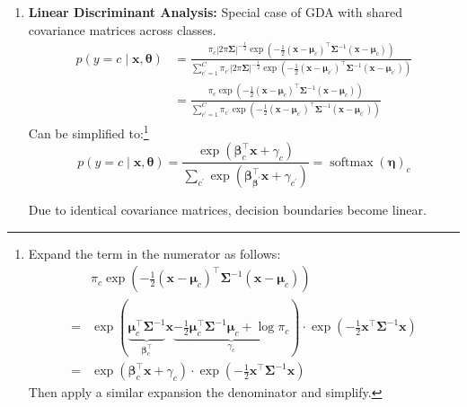 \documentclass[11pt, %
	oneside, %
	english, %
	onehalfspacing, %
	parskip, %
	]{article} %
\theoremstyle{definition}
\begin{document}
\begin{enumerate}
	\item \textbf{Linear Discriminant Analysis:} Special case of GDA with shared covariance matrices across classes.
	\begin{equation*}
		\begin{aligned}
			p(y=c \mid \mathbf{x}, \boldsymbol{\theta}) & =\frac{\pi_c|2 \pi \boldsymbol{\Sigma}|^{-\frac{1}{2}} \exp \left(-\frac{1}{2}\left(\mathbf{x}-\boldsymbol{\mu}_c\right)^{\top} \boldsymbol{\Sigma}^{-1}\left(\mathbf{x}-\boldsymbol{\mu}_c\right)\right)}{\sum_{c^{\prime}=1}^C \pi_{c^{\prime}}|2 \pi \boldsymbol{\Sigma}|^{-\frac{1}{2}} \exp \left(-\frac{1}{2}\left(\mathbf{x}-\boldsymbol{\mu}_{c^{\prime}}\right)^{\top} \boldsymbol{\Sigma}^{-1}\left(\mathbf{x}-\boldsymbol{\mu}_{c^{\prime}}\right)\right)} \\
			& =\frac{\pi_c \exp \left(-\frac{1}{2}\left(\mathbf{x}-\boldsymbol{\mu}_c\right)^{\top} \boldsymbol{\Sigma}^{-1}\left(\mathbf{x}-\boldsymbol{\mu}_c\right)\right)}{\sum_{c^{\prime}=1}^C \pi_{c^{\prime}} \exp \left(-\frac{1}{2}\left(\mathbf{x}-\boldsymbol{\mu}_{c^{\prime}}\right)^{\top} \boldsymbol{\Sigma}^{-1}\left(\mathbf{x}-\boldsymbol{\mu}_{c^{\prime}}\right)\right)}
			\end{aligned}
	\end{equation*}
	Can be simplified to:\footnote{Expand the term in the numerator as follows:
	\begin{equation*}
		\begin{aligned}
			& \pi_c \exp \left(-\frac{1}{2}\left(\mathbf{x}-\boldsymbol{\mu}_c\right)^{\top} \boldsymbol{\Sigma}^{-1}\left(\mathbf{x}-\boldsymbol{\mu}_c\right)\right) \\
			= & \exp (\underbrace{\boldsymbol{\mu}_c^{\top} \boldsymbol{\Sigma}^{-1}}_{\boldsymbol{\beta}_c^{\top}} \mathbf{x} \underbrace{-\frac{1}{2} \boldsymbol{\mu}_c^{\top} \boldsymbol{\Sigma}^{-1} \boldsymbol{\mu}_c+\log \pi_c}_{\gamma_c}) \cdot \exp \left(-\frac{1}{2} \mathbf{x}^{\top} \boldsymbol{\Sigma}^{-1} \mathbf{x}\right) \\
			= & \exp \left(\boldsymbol{\beta}_c^{\top} \mathbf{x}+\gamma_c\right) \cdot \exp \left(-\frac{1}{2} \mathbf{x}^{\top} \boldsymbol{\Sigma}^{-1} \mathbf{x}\right)
		\end{aligned}
	\end{equation*}
	Then apply a similar expansion the denominator and simplify.
	}
	\begin{equation*}
		p(y=c \mid \mathbf{x}, \boldsymbol{\theta})=\frac{\exp \left(\boldsymbol{\beta}_c^{\top} \mathbf{x}+\gamma_c\right)}{\sum_{c^{\prime}} \exp \left(\boldsymbol{\beta}_{\boldsymbol{\beta}^{\prime}}^{\top} \mathbf{x}+\gamma_{c^{\prime}}\right)}=\operatorname{softmax}(\boldsymbol{\eta})_c
	\end{equation*}

	Due to identical covariance matrices, decision boundaries become linear.
\end{enumerate}
\end{document}
